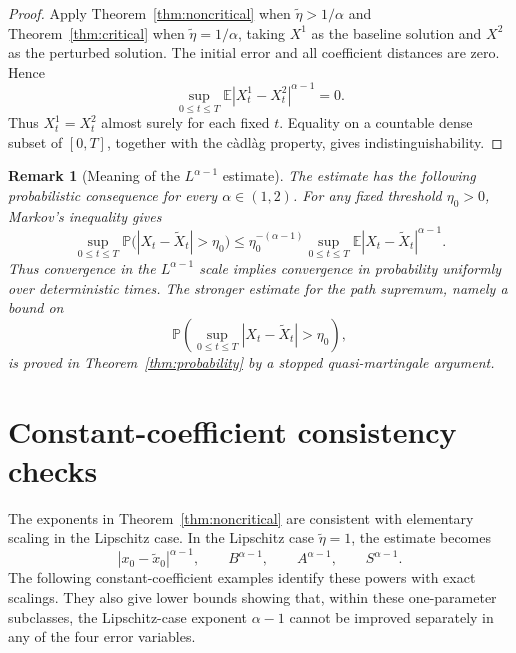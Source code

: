 \documentclass[11pt]{article}
\newtheorem{remark}[theorem]{Remark}
\newcommand{\E}{\mathbb{E}}
\newcommand{\1}{\mathbf{1}}
\newcommand{\wt}{\tilde}
\begin{document}
\begin{proof}
Apply Theorem~\ref{thm:noncritical} when $\wt\eta>1/\alpha$ and Theorem~\ref{thm:critical} when $\wt\eta=1/\alpha$, taking $X^1$ as the baseline solution and $X^2$ as the perturbed solution. The initial error and all coefficient distances are zero. Hence
\[
  \sup_{0\le t\le T}\E|X_t^1-X_t^2|^{\alpha-1}=0.
\]
Thus $X_t^1=X_t^2$ almost surely for each fixed $t$. Equality on a countable dense subset of $[0,T]$, together with the c\`adl\`ag property, gives indistinguishability.
\end{proof}

\begin{remark}[Meaning of the $L^{\alpha-1}$ estimate]
The estimate has the following probabilistic consequence for every $\alpha\in(1,2)$. For any fixed threshold $\eta_0>0$, Markov's inequality gives
\[
  \sup_{0\le t\le T}\mathbb P\bigl(|X_t-\wt X_t|>\eta_0\bigr)
  \le \eta_0^{-(\alpha-1)}
  \sup_{0\le t\le T}\E|X_t-\wt X_t|^{\alpha-1}.
\]
Thus convergence in the $L^{\alpha-1}$ scale implies convergence in probability uniformly over deterministic times. The stronger estimate for the path supremum, namely a bound on
\[
  \mathbb P\left(\sup_{0\le t\le T}|X_t-\wt X_t|>\eta_0\right),
\]
is proved in Theorem~\ref{thm:probability} by a stopped quasi-martingale argument.
\end{remark}


\section{Constant-coefficient consistency checks}
\label{sec:consistency}

The exponents in Theorem~\ref{thm:noncritical} are consistent with elementary scaling in the Lipschitz case. In the Lipschitz case $\wt\eta=1$, the estimate becomes
\[
  |x_0-\wt x_0|^{\alpha-1},\qquad
  B^{\alpha-1},\qquad A^{\alpha-1},\qquad S^{\alpha-1}.
\]
The following constant-coefficient examples identify these powers with exact scalings. They also give lower bounds showing that, within these one-parameter subclasses, the Lipschitz-case exponent $\alpha-1$ cannot be improved separately in any of the four error variables.
\end{document}
